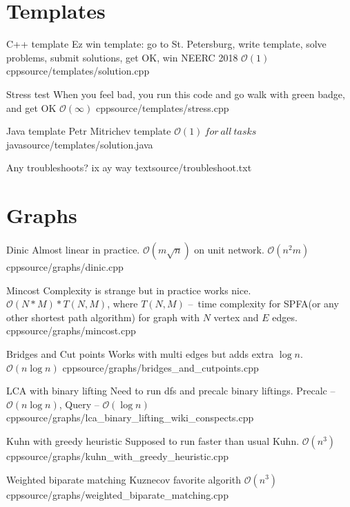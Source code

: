 \documentclass[landscape, 10pt, a4paper, oneside, twocolumn]{extarticle}
\begin{document}
\maketitlepage



\section{Templates}

\Algorithm
{C++ template}
{Ez win template: go to St. Petersburg, write template, solve problems, submit solutions, get OK, win NEERC 2018}
{$\mathcal{O}(1)$}
{cpp}{source/templates/solution.cpp}

\Algorithm
{Stress test}
{When you feel bad, you run this code and go walk with green badge, and get OK}
{$\mathcal{O}(\infty)$}
{cpp}{source/templates/stress.cpp}

\Algorithm
{Java template}
{Petr Mitrichev template}
{$\mathcal{O}(1)\ for\ all\ tasks$}
{java}{source/templates/solution.java}

\Algorithm
{Any troubleshoots?}
{ix ay way}
{}
{text}{source/troubleshoot.txt}




\section{Graphs}

\Algorithm
{Dinic}
{Almost linear in practice. $\mathcal{O}(m \sqrt n)$ on unit network.}
{$\mathcal{O}(n^{2}m)$}
{cpp}{source/graphs/dinic.cpp}

\Algorithm
{Mincost}
{Complexity is strange but in practice works nice.}
{$\mathcal{O}(N * M) * T(N, M)$, where $T(N, M)$ – time complexity for SPFA(or any other shortest path algorithm) for graph with $N$ vertex and $E$ edges.}
{cpp}{source/graphs/mincost.cpp}

\Algorithm
{Bridges and Cut points}
{Works with multi edges but adds extra $ \log n$.}
{$\mathcal{O}(n \log n)$}
{cpp}{source/graphs/bridges_and_cutpoints.cpp}

\Algorithm
{LCA with binary lifting}
{Need to run dfs and precalc binary liftings.}
{Precalc – $\mathcal{O}(n \log n)$, Query – $\mathcal{O}(\log n)$}
{cpp}{source/graphs/lca_binary_lifting_wiki_conspects.cpp}

\Algorithm
{Kuhn with greedy heuristic}
{Supposed to run faster than usual Kuhn.}
{$\mathcal{O}(n^{3})$}
{cpp}{source/graphs/kuhn_with_greedy_heuristic.cpp}

\Algorithm
{Weighted biparate matching}
{Kuznecov favorite algorith}
{$\mathcal{O}(n^{3})$}
{cpp}{source/graphs/weighted_biparate_matching.cpp}
\end{document}

